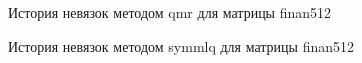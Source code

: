 \begin{figure}[H]
    \renewcommand{\figurename}{Рисунок}
    \caption{История невязок методом qmr для матрицы finan512}
    \label{fig:image_41}
\end{figure}

\begin{figure}[H]
    \renewcommand{\figurename}{Рисунок}
    \caption{История невязок методом symmlq для матрицы finan512}
    \label{fig:image_42}
\end{figure}

